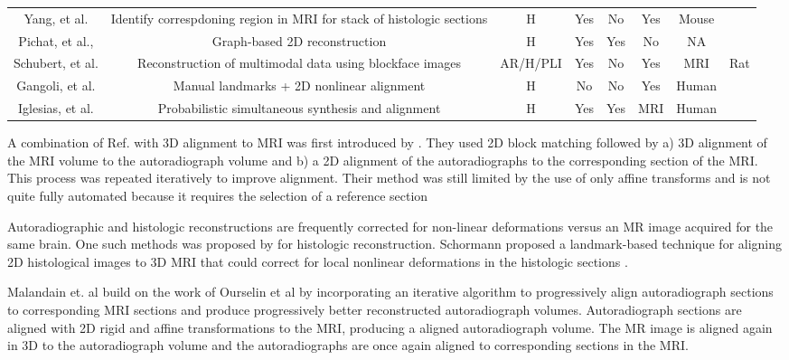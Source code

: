 \documentclass[12pt]{article}
\begin{document}
\begin{center}
\begin{tabular}{ | c | c | c | c | c | c | c | }
    Yang, et al. \cite{Yang2012} & Identify correspdoning region in MRI for stack of histologic sections  & H & Yes & No & Yes & Mouse \\ 
    Pichat, et al., \cite{Pichat2015} & Graph-based 2D reconstruction & H & Yes & Yes & No & NA \\
    Schubert, et al. \cite{Schubert2016} & Reconstruction of multimodal data using blockface images & AR/H/PLI & Yes & No & Yes & MRI & Rat \\
    Gangoli, et al. \cite{Gangolli2017} & Manual landmarks + 2D nonlinear alignment  & H & No & No & Yes & Human \\
    Iglesias, et al. \cite{Iglesias2018} & Probabilistic simultaneous synthesis and alignment &  H & Yes & Yes & MRI & Human \\ 
    \hline
    
\end{tabular}
\end{center}

A combination of Ref. \cite{Ourselin2001} with 3D alignment to MRI was first introduced by \cite{Malandain2004}. They used 2D block matching followed by a) 3D alignment of the MRI volume to the autoradiograph volume and b) a 2D alignment of the autoradiographs to the corresponding section of the MRI. This process was repeated iteratively to improve alignment. Their method was still limited by the use of only affine transforms and is not quite fully automated because it requires the selection of a reference section

Autoradiographic and histologic reconstructions are frequently corrected for non-linear deformations versus an MR image acquired for the same brain. One such methods was proposed by \cite{Schormann1993} for histologic reconstruction. Schormann proposed a landmark-based technique for aligning 2D histological images to 3D MRI that could correct for local nonlinear deformations in the histologic sections \cite{Shormann1995}. 

Malandain et. al \cite{Malandain2004} build on the work of Ourselin et al \cite{Ourselin2001} by incorporating an iterative algorithm to progressively align autoradiograph sections to corresponding MRI sections and produce progressively better reconstructed autoradiograph volumes. Autoradiograph sections are aligned with 2D rigid and affine transformations to the MRI, producing a aligned autoradiograph volume. The MR image is aligned again in 3D to the autoradiograph volume and the autoradiographs are once again aligned to corresponding sections in the MRI.
\end{document}
